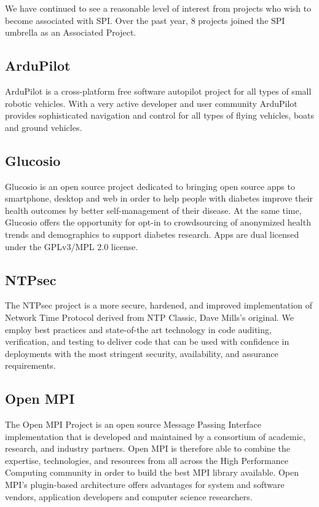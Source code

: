 \documentclass[letterpaper]{report}
\begin{document}
We have continued to see a reasonable level of interest from projects
who wish to become associated with SPI. Over the past year, 8 projects
joined the SPI umbrella as an Associated Project.

\subsection{ArduPilot}

ArduPilot is a cross-platform free software autopilot project for all
types of small robotic vehicles. With a very active developer and user
community ArduPilot provides sophisticated navigation and control for
all types of flying vehicles, boats and ground vehicles.

\subsection{Glucosio}

Glucosio is an open source project dedicated to bringing open source
apps to smartphone, desktop and web in order to help people with
diabetes improve their health outcomes by better self-management of
their disease. At the same time, Glucosio offers the opportunity for
opt-in to crowdsourcing of anonymized health trends and demographics to
support diabetes research. Apps are dual licensed under the GPLv3/MPL
2.0 license.

\subsection{NTPsec}

The NTPsec project is a more secure, hardened, and improved
implementation of Network Time Protocol derived from NTP Classic, Dave
Mills's original. We employ best practices and state-of-the art
technology in code auditing, verification, and testing to deliver code
that can be used with confidence in deployments with the most stringent
security, availability, and assurance requirements.

\subsection{Open MPI}

The Open MPI Project is an open source Message Passing Interface
implementation that is developed and maintained by a consortium of
academic, research, and industry partners. Open MPI is therefore able to
combine the expertise, technologies, and resources from all across the
High Performance Computing community in order to build the best MPI
library available. Open MPI's plugin-based architecture offers
advantages for system and software vendors, application developers and
computer science researchers.
\end{document}
